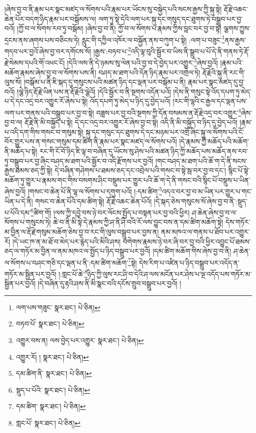 །ཞེས་བྱ་བ་ནི་རྣམ་པར་སྣང་མཛད་ལ་སོགས་པའི་རྣམ་པར་ཡོངས་སུ་བསྐྱེད་པའི་སངས་རྒྱས་ཀྱི་སྐུ་སྟེ། རྡོ་རྗེ་འཆང་ཆེན་པོར་བདག་ཉིད་རྣམ་པར་བསྒོམས་ལ། ལག་ཏུ་སྟེ་དེའི་ལག་པར་སྐུ་དང་གསུད་དང་ཐུགས་ཏེ་བསྒྲུབ་པར་བྱ་བའོ། །ཀྱོ་བ་ལ་སོགས་རབ་ཏུ་བསྒོམ། །ཞེས་བྱ་བ་ནི། ཀྱོ་བ་ལ་སོགས་པ་རྣམས་ཀྱིས་བླང་བར་བྱ་བ་སྟེ། ལྕགས་ཀྱུས་དྲངས་ནས་ཞགས་པས་བཅིངས་ཏེ། རླུང་གི་དཀྱིལ་འཁོར་ལ་བསྐྱོན་ནས་བཀུག་པ་སྟེ། :ལག་པ་བཟུང་\footnote{ལག་པས་གཟུང་  སྣར་ཐང་།  པེ་ཅིན། }ནས་རྒྱས་གདབ་པར་བྱའོ་ཞེས་བྱ་བར་དགོངས་སོ། །རྒྱས་:བཏབ་པ་\footnote{བཏབ་པོ་  སྣར་ཐང་།  པེ་ཅིན། }འདི་ལྟ་བུའི་སྦྱོར་བ་ཡིས་ནི་སྒྲུབ་པ་པོ་དེ་ནི་གནས་ཏེ་རྡོ་རྗེ་སེམས་དཔའི་གོ་འཕང་ངོ། །དེའི་ལས་ནི་དེ་ཉམས་སུ་ལེན་པའི་བྱ་བ་དེ་བྱེད་པར་འགྱུར་\footnote{འགྱུར་བས་ན། ལས་བྱེད་པར་འགྱུར་  སྣར་ཐང་།  པེ་ཅིན། }ཞེས་བྱའོ། །རྣམ་པའི་མཆོག་རྣམས་ཞེས་བྱ་བ་ལ་སོགས་པས་ནི། བཤད་མ་ཐག་པའི་དོན་ཉིད་རྣམ་པར་འགྲེལ་ཏེ། རྡོ་རྗེའི་སྐུ་ནི་རང་གི་ལུས་སོ། །བསྒོམ་པ་ནི་ཇི་སྐད་དུ་གསུངས་པའི་མཚན་ཉིད་དང་ལྡན་པར་བསྒོམ་པ་ནི། རྣམ་པར་སྣང་མཛད་དུ་བྱ་བའོ། །ལྕེ་ཉིད་རྡོ་རྗེ་ཡིན་པས་ན་རྡོ་རྗེའི་ལྕེའོ། །དེའི་སྦྱོར་བ་ནི་སྔགས་འདོན་པའོ། །དེས་ནི་གསུང་སྟེ་འོད་དཔག་ཏུ་མེད་པ་དེ་དང་འདྲ་བར་འགྱུར་རོ་ཞེས་པ་སྟེ། འོད་དཔག་ཏུ་མེད་པ་ཉིད་དུ་བྱེད་པའོ། །རང་གི་ལྷའི་ང་རྒྱལ་དང་ལྡན་པས་ལག་པར་གནས་པའི་བསྒྲུབ་པར་བྱ་བ་སྟེ། བཟླས་པར་བྱ་བའི་སྔགས་ཀྱི་དོན་བསམས་ན་རྡོ་རྗེ་འདྲ་བར་འགྱུར་\footnote{འགྱུར་རོ། །  སྣར་ཐང་།  པེ་ཅིན། }ཞེས་བྱ་བ་ལ། རྡོ་རྗེ་ནི་མི་བསྐྱོད་པ་སྟེ། དེ་དང་འདྲ་བར་འགྱུར་རོ་ཞེས་བྱ་བ་སྟེ། འདི་ནི་མི་བསྐྱོད་བ་ཉིད་དུ་བྱེད་པའོ། །རྣམ་པ་འདི་དག་གིས་གསང་བ་གསུམ་སྟེ། སྐུ་དང་གསུང་དང་ཐུགས་དེ་དང་མཉམ་པར་འགྲོ་ཞིང་སྐུ་ལ་སོགས་པའི་ངོ་བོར་གྱུར་པས་ན་གསང་གསུམ་དམ་ཚིག་ནི་རྣམ་པར་སྣང་མཛད་ལ་སོགས་པའོ། །དེ་རྣམས་ཀྱི་མཆོད་པའི་མཆོག་ནི་མཆོད་པ་སྟེ། རང་གི་ངོ་བོ་ཉིད་ཇི་ལྟ་བ་བཞིན་དུ་ཡོངས་སུ་ཤེས་པའི་མཚན་ཉིད་ཀྱི་མཆོད་པས་མཆོད་ནས་རབ་ཏུ་བསྒྲུབ་པར་བྱ་ཞིང་བཤད་མ་ཐག་པའི་སྦྱོར་བ་འདི་རྫོགས་པར་བྱའོ། །གང་བཤད་མ་ཐག་པའི་ཆོ་ག་དེ་ནི་སངས་རྒྱས་ཐམས་ཅད་ཀྱི་སྟེ། དེ་བཞིན་གཤེགས་པ་ཐམས་ཅད་དང་འབྲེལ་པའི་གསང་བ་སྟེ་སྦ་བར་བྱ་བ་དང་། སྙིང་པོ་སྟེ་མཆོག་ཏུ་གྱུར་པ་རྣམས་གང་གིས་བསགས་ཤིང་བསྡུས་པར་གྱུར་པའི་ཆོ་ག་དེ་ནི་གསང་བའི་སྙིང་པོ་བསྡུས་པ་ཡིན་ཞེས་བྱའོ། །གསང་བ་ཆེན་པོ་ནི་ལྷ་ལ་སོགས་པ་དགུག་པའོ། །:དམ་ཚིག་\footnote{དམ་ཚིག་ནི་  སྣར་ཐང་།  པེ་ཅིན། }འདའ་བར་བྱ་བ་མ་ཡིན་པར་གྱུར་པ་གང་ཡིན་པ་དེ་ནི། གསང་བ་ཆེན་པོའི་དམ་ཚིག་སྟེ། རྡོ་རྗེ་འཆང་ཆེན་པོའོ། །དེ་སྐད་ཅེས་གསུངས་སོ་ཞེས་བྱ་བ་ནི་:སྡུད་པ་པོའི་དམ་\footnote{སྡུད་པ་པོའི་  སྣར་ཐང་།  པེ་ཅིན། }ཚིག་གོ། །ལས་ཀྱི་དབྱེ་བས་ཉེ་བར་ལོངས་སྤྱོད་པ་བསྟན་པར་བྱ་བའི་ཕྱིར། ཤ་ཆེན་ཞེས་བྱ་བ་ལ་སོགས་པ་གསུངས་ཏེ། ཆེ་བ་ནི་མི་སྟེ་དེ་རྣམས་ཀྱི་ཤ་ནི་ཤི་བའི་རོ་ལས་བྱུང་བས་ན་དམ་ཚིག་མཆོག་སྟེ། དེས་གཏོར་མ་བྱིན་ལ་རྡོ་རྗེ་གསུམ་མཆོག་ཅེས་བྱ་བ་རང་གི་ལུས་བསྒྲུབ་པར་བྱས་ན། ནམ་མཁའ་ལ་གནས་པ་ཐོབ་པར་འགྱུར་རོ། །དེ་ཡང་ཁ་ན་མ་ཐོ་བ་མེད་པར་རྙེད་པའི་མིའི་ཤས། བགེགས་རྣམས་ཉེ་བར་ཞི་བར་བྱ་བའི་ཕྱིར་འབྱུང་པོ་ཐམས་ཅད་ལ་གཏོར་མ་བྱིན་ལ་ནམ་མཁའ་ལ་སྤྱོད་པ་ཉིད་བསྒྲུབ་པར་བྱའོ། །དམ་ཚིག་མཆོག་གིས་ཞེས་བྱ་བ་ནི། ཤ་ཆེན་ལ་སོགས་པ་བཤང་གཅི་དང་ལྡན་པ་ནི་:དམ་ཚིག་མཆོག་\footnote{དམ་ཚིག་  སྣར་ཐང་།  པེ་ཅིན། }སྟེ། དེས་རིག་པ་འཛིན་པ་ཉིད་བསྒྲུབ་པར་འདོད་ན་གཏོར་མ་སྦྱིན་པར་བྱའོ། །:གླང་པོ་ཆེ་\footnote{གླང་པོ་  སྣར་ཐང་།  པེ་ཅིན། }ཉིད་ཀྱི་ལུས་རང་ཤི་བ་དེའི་ཤ་ལས་མངོན་པར་ཤེས་པ་ལྔ་འདོད་པས་གཏོར་མ་སྦྱིན་པར་བྱའོ། །དེ་བཞིན་དུ་རྟའི་ཤས་ནི་མི་སྣང་བའི་དངོས་གྲུབ་བསྒྲུབ་པར་བྱའོ། །
